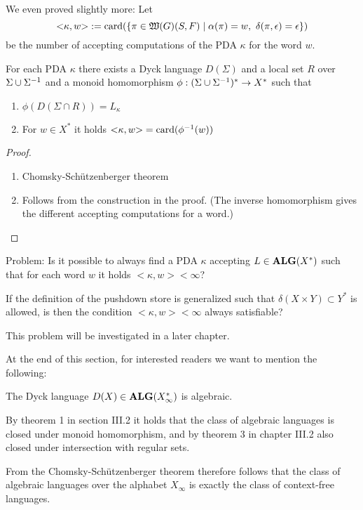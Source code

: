 We even proved slightly more: Let 
\[ {<}\kappa, w{>} := \mathrm{card}({\mbox{$\{\pi \in
\mbox{$\mathfrak{W}({G})$}(S,F) \mid \alpha(\pi) = w,\ \delta(\pi, \epsilon) = \epsilon\}$}})
\]
be the number of accepting computations of the PDA $\kappa$ for the word $w$.

\begin{corollary}
For each PDA $\kappa$ there exists a Dyck language $D(\Sigma)$ and a local set
$R$ over $\Sigma \cup {\Sigma}^{-1}$ and a monoid homomorphism $\phi:
(\Sigma \cup {\Sigma}^{-1})^* \to X^*$ such that
\begin{enumerate}
  \item $\phi(D(\Sigma\cap R)) = L_\kappa$
  \item For $w\in X^*$ it holds ${<}\kappa, w{>} = \mathrm{card}({\phi^{-1}(w)})$
\end{enumerate}
\end{corollary}

\begin{proof}\ 

\begin{enumerate}
  \item Chomsky-Schützenberger theorem
  \item Follows from the construction in the proof. (The inverse homomorphism
  gives the different accepting computations for a word.)
\end{enumerate}
\end{proof}

Problem: Is it possible to always find a PDA $\kappa$ accepting 
$L \in \mbox{{\bf ALG}}(X^*)$ such that for each word $w$ it holds 
${<}\kappa, w{>} < \infty$?

If the definition of the pushdown store is generalized such that $\delta(X
\times Y) \subset Y^*$ is allowed, is then the condition ${<}\kappa, w{>} <
\infty$ always satisfiable?

This problem will be investigated in a later chapter.

\medskip
At the end of this section, for interested readers we want to mention the
following:

The Dyck language $D(X) \in \mbox{{\bf ALG}}(X_\infty^*)$ is algebraic.

By theorem 1 in section III.2 it holds that the class of algebraic languages is
closed under monoid homomorphism, and by theorem 3 in chapter III.2 also closed
under intersection with regular sets.

From the Chomsky-Schützenberger theorem therefore follows that the class of
algebraic languages over the alphabet $X_\infty$ is exactly the class of
context-free languages.
